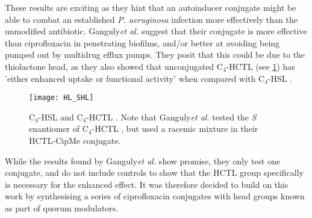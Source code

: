These results are exciting as they hint that an autoinducer conjugate might be able to combat an established \textit{P. aeruginosa} infection more effectively than the unmodified antibiotic. 
Ganguly\textit{et al.} suggest that their conjugate is more effective than ciprofloxacin in penetrating biofilms, and/or better at avoiding being pumped out by multidrug efflux pumps. They posit that this could be due to the thiolactone head, as they also showed that unconjugated C$_4$-HCTL  (see \ref{fig:HL_SHL}) has 'either enhanced uptake or functional activity' when compared with C$_4$-HSL . 

\begin{figure}[H]
	\begin{center}
		\texttt{[image: HL\_SHL]}
		\caption{
		C$_4$-HSL  and C$_4$-HCTL . Note that Ganguly\textit{et al.} tested the \textit{S} enantiomer of C$_4$-HCTL , but used a racemic mixture in their HCTL-CipMe conjugate.
		\label{fig:HL_SHL}}
	\end{center}
\end{figure}

While the results found by Ganguly\textit{et al.} show promise, they only test one conjugate, and do not include controls to show that the HCTL group specifically is necessary for the enhanced effect.
It was therefore decided to build on this work by synthesising a series of ciprofloxacin conjugates with head groups known as part of quorum modulators\cite{Galloway2011,Hodgkinson2012a}.






